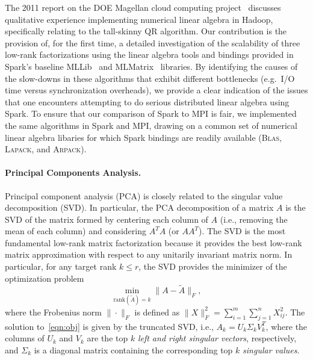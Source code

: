 The 2011 report on the DOE Magellan cloud computing project~\cite{magellan2011} discusses qualitative experience implementing numerical linear algebra in Hadoop, specifically relating to the tall-skinny QR algorithm. Our contribution is the provision of, for the first time, a detailed investigation of the scalability of three low-rank factorizations using the linear algebra tools and bindings provided in Spark's baseline MLLib~\cite{meng2016mllib} and MLMatrix~\cite{zadeh2016matrix} libraries. By identifying the causes of the slow-downs in these algorithms that exhibit different bottlenecks (e.g.~I/O time versus synchronization overheads), we provide a clear indication of the issues that one encounters attempting to do serious distributed linear algebra using Spark.
To ensure that our comparison of Spark to MPI is fair, we implemented the same algorithms in Spark and MPI, drawing on a common set of numerical linear algebra libaries for which Spark bindings are readily available (\textsc{Blas}, \textsc{Lapack}, and \textsc{Arpack}).

\paragraph{Principal Components Analysis.} 
Principal component analysis (PCA) is closely related to the singular value decomposition (SVD).
In particular, the PCA decomposition of a matrix $A$ is the SVD of the matrix formed by centering each column of $A$ (i.e., removing the mean of each column) and considering $A^TA$ (or $AA^T$).
The SVD is the most fundamental low-rank matrix factorization because it provides the best low-rank matrix approximation with respect to any unitarily invariant matrix norm.
In particular, for any target rank $k \leq r$, the SVD provides the minimizer of the optimization problem
\begin{equation}
 \label{eqn:obj}
  \min_{\text{rank}(\tilde A) = k} \| A - \tilde A \|_F,
\end{equation}
where the Frobenius norm $\| \cdot \|_F$ is defined as $\|X\|_F^2 =
\sum_{i=1}^m \sum_{j=1}^n X_{ij}^2 $.
The solution
to~\eqref{eqn:obj} is given by the truncated SVD, i.e., $A_k = U_k \Sigma_k
V_k^T$, where the columns of $U_k$ and $V_k$ are the top $k$ {\it left and right singular vectors}, respectively, and $\Sigma_k$ is a 
diagonal matrix containing the corresponding top $k$ {\it singular values}.



